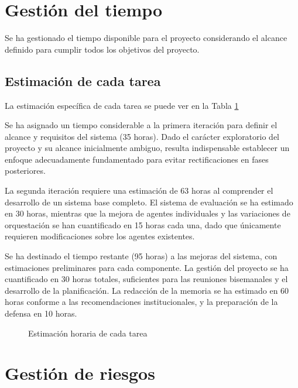 \section{Gestión del tiempo}
Se ha gestionado el tiempo disponible para el proyecto considerando el alcance definido para cumplir todos los objetivos del proyecto. 

\subsection{Estimación de cada tarea}
La estimación específica de cada tarea se puede ver en la Tabla \ref{fig:horas}

Se ha asignado un tiempo considerable a la primera iteración para definir el alcance y requisitos del sistema (35 horas). Dado el carácter exploratorio del proyecto y su alcance inicialmente ambiguo, resulta indispensable establecer un enfoque adecuadamente fundamentado para evitar rectificaciones en fases posteriores.

La segunda iteración requiere una estimación de 63 horas al comprender el desarrollo de un sistema base completo. El sistema de evaluación se ha estimado en 30 horas, mientras que la mejora de agentes individuales y las variaciones de orquestación se han cuantificado en 15 horas cada una, dado que únicamente requieren modificaciones sobre los agentes existentes.

Se ha destinado el tiempo restante (95 horas) a las mejoras del sistema, con estimaciones preliminares para cada componente. La gestión del proyecto se ha cuantificado en 30 horas totales, suficientes para las reuniones bisemanales y el desarrollo de la planificación. La redacción de la memoria se ha estimado en 60 horas conforme a las recomendaciones institucionales, y la preparación de la defensa en 10 horas.

\begin{figure}[h]
  \centering
  \caption{Estimación horaria de cada tarea}
  \label{fig:horas}
\end{figure}

\section{Gestión de riesgos}

